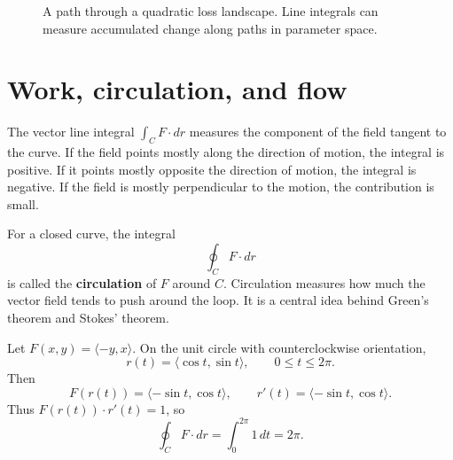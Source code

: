 \documentclass[11pt,oneside]{book}
\begin{document}
\begin{figure}[H]
\centering
{}
\caption{A path through a quadratic loss landscape. Line integrals can measure accumulated change along paths in parameter space.}
\end{figure}

\section{Work, circulation, and flow}

The vector line integral $\int_C F\cdot dr$ measures the component of the field tangent to the curve. If the field points mostly along the direction of motion, the integral is positive. If it points mostly opposite the direction of motion, the integral is negative. If the field is mostly perpendicular to the motion, the contribution is small.

For a closed curve, the integral
\[
\oint_C F\cdot dr
\]
is called the \textbf{circulation} of $F$ around $C$. Circulation measures how much the vector field tends to push around the loop. It is a central idea behind Green's theorem and Stokes' theorem.

\begin{examplebox}
Let $F(x,y)=\langle -y,x\rangle$. On the unit circle with counterclockwise orientation,
\[
r(t)=\langle \cos t,\sin t\rangle,\qquad 0\le t\le 2\pi.
\]
Then
\[
F(r(t))=\langle -\sin t,\cos t\rangle,
\qquad
r'(t)=\langle -\sin t,\cos t\rangle.
\]
Thus $F(r(t))\cdot r'(t)=1$, so
\[
\oint_C F\cdot dr=\int_0^{2\pi}1\,dt=2\pi.
\]
\end{examplebox}
\end{document}

